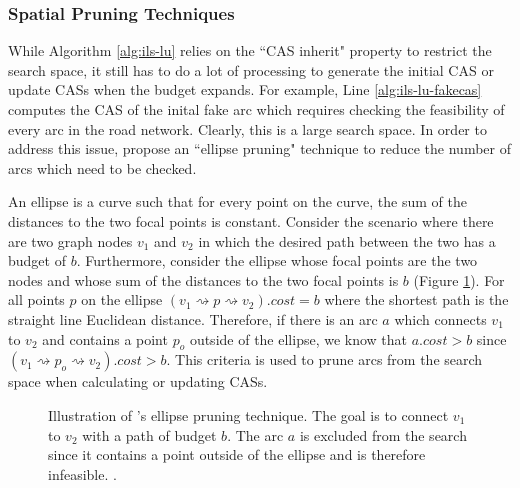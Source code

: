 \documentclass[honors]{union-cs-thesis}
\newcommand{\spa}{\rightsquigarrow}
\begin{document}
\subsubsection{Spatial Pruning Techniques}\label{sec:pruning}
While Algorithm \ref{alg:ils-lu} relies on the ``CAS inherit" property to restrict the search space, it still has to do a lot of processing to generate the initial CAS or update CASs when the budget expands. For example, Line \ref{alg:ils-lu-fakecas} computes the CAS of the inital fake arc which requires checking the feasibility of every arc in the road network. Clearly, this is a large search space. In order to address this issue,  \citeauthor{lu2015arc} propose an ``ellipse pruning" technique to reduce the number of arcs which need to be checked.


An ellipse is a curve such that for every point on the curve, the sum of the distances to the two focal points is constant. Consider the scenario where there are two graph nodes $v_1$ and $v_2$ in which the desired path between the two has a budget of $b$. Furthermore, consider the ellipse whose focal points are the two nodes and whose sum of the distances to the two focal points is $b$ (Figure \ref{fig:ellipse}). For all points $p$ on the ellipse $(v_1 \spa p \spa v_2).cost = b$ where the shortest path is the straight line Euclidean distance. Therefore, if there is an arc $a$ which connects $v_1$ to $v_2$ and contains a point $p_o$ outside of the ellipse, we know that $a.cost > b$ since $(v_1 \spa p_o \spa v_2).cost > b$. This criteria is used to prune arcs from the search space when calculating or updating CASs.

\begin{figure}
\begin{center}
\end{center}
\caption{Illustration of \citeauthor{lu2015arc}'s ellipse pruning technique. The goal is to connect $v_1$ to $v_2$ with a path of budget $b$. The arc $a$ is excluded from the search since it contains a point outside of the ellipse and is therefore infeasible. \cite{lu2015arc}.}
\label{fig:ellipse}
\end{figure}
\end{document}
